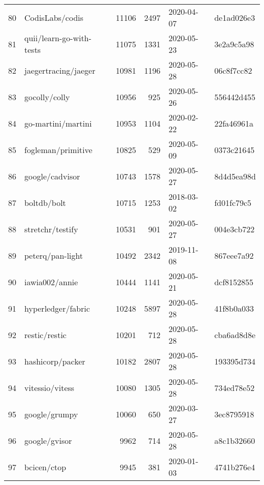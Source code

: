 \begin{longtable}{llrrll}
    80  &                                    CodisLabs/codis &  11106 &   2497 & 2020-04-07 &  de1ad026e3 \\
    81  &                           quii/learn-go-with-tests &  11075 &   1331 & 2020-05-23 &  3e2a9c5a98 \\
    82  &                               jaegertracing/jaeger &  10981 &   1196 & 2020-05-28 &  06c8f7cc82 \\
    83  &                                      gocolly/colly &  10956 &    925 & 2020-05-26 &  556442d455 \\
    84  &                                 go-martini/martini &  10953 &   1104 & 2020-02-22 &  22fa46961a \\
    85  &                                 fogleman/primitive &  10825 &    529 & 2020-05-09 &  0373c21645 \\
    86  &                                    google/cadvisor &  10743 &   1578 & 2020-05-27 &  8d4d5ea98d \\
    87  &                                        boltdb/bolt &  10715 &   1253 & 2018-03-02 &  fd01fc79c5 \\
    88  &                                   stretchr/testify &  10531 &    901 & 2020-05-27 &  004e3cb722 \\
    89  &                                   peterq/pan-light &  10492 &   2342 & 2019-11-08 &  867eee7a92 \\
    90  &                                     iawia002/annie &  10444 &   1141 & 2020-05-21 &  dcf8152855 \\
    91  &                                 hyperledger/fabric &  10248 &   5897 & 2020-05-28 &  41f8b0a033 \\
    92  &                                      restic/restic &  10201 &    712 & 2020-05-28 &  cba6ad8d8e \\
    93  &                                   hashicorp/packer &  10182 &   2807 & 2020-05-28 &  193395d734 \\
    94  &                                    vitessio/vitess &  10080 &   1305 & 2020-05-28 &  734ed78e52 \\
    95  &                                      google/grumpy &  10060 &    650 & 2020-03-27 &  3ec8795918 \\
    96  &                                      google/gvisor &   9962 &    714 & 2020-05-28 &  a8c1b32660 \\
    97  &                                        bcicen/ctop &   9945 &    381 & 2020-01-03 &  4741b276e4 \\

\end{longtable}
